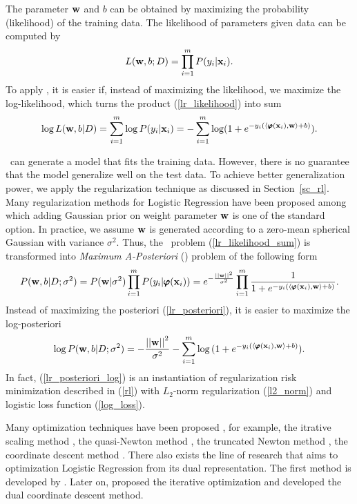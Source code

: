 {%
The parameter $\mathbf {w}$ and $b$ can be obtained by maximizing the probability (likelihood) of the training data.
The likelihood of parameters given data can be computed by
\begin{align}
	L(\mathbf {w},b;D) = \prod_{i=1}^mP(y_i|\mathbf {x}_i). \label{lr_likelihood}
\end{align}
To apply \mle, it is easier if, instead of maximizing the likelihood, we maximize the log-likelihood, which turns the product (\ref{lr_likelihood}) into sum
\begin{align}
	\log L(\mathbf {w},b|D) = \sum_{i=1}^{m}\log P(y_i|\mathbf {x}_i) = -\sum_{i=1}^{m}\log (1+e^{ -y_i(\langle \pmb \varphi(\mathbf {x}_i), \mathbf {w} \rangle+b) }) \label{lr_likelihood_sum}.
\end{align}

\mle\ can generate a model that fits the training data.
However, there is no guarantee that the model generalize well on the test data.
To achieve better generalization power, we apply the regularization technique as discussed in Section~\ref{sc_rl}.
Many regularization methods for Logistic Regression have been proposed \citep{Chen99,Chen00,Goodman03} among which adding Gaussian prior on weight parameter $\mathbf {w}$ is one of the standard option.
In practice, we assume $\mathbf {w}$ is generated according to a zero-mean spherical Gaussian with variance $\sigma^2$.
Thus, the \mle\ problem (\ref{lr_likelihood_sum}) is transformed into \textit{Maximum A-Posteriori} (\map) problem of the following form
\begin{align}
	P(\mathbf {w},b|D;\sigma^2) = P(\mathbf {w}|\sigma^2)\prod_{i=1}^mP(y_i|\pmb \varphi(\mathbf {x}_i))=e^{ -\frac{\left|\left| \mathbf {w} \right|\right|^2}{\sigma^2} }\prod_{i=1}^{m}{\frac{1}{1+e^{ -y_i(\langle \pmb \varphi(\mathbf {x}_i), \mathbf {w} \rangle+b) }}}. \label{lr_posteriori}
\end{align}
Instead of maximizing the posteriori (\ref{lr_posteriori}), it is easier to maximize the log-posteriori
\begin{align}
	\log P(\mathbf {w},b|D;\sigma^2) = -{\frac{\left|\left| \mathbf {w} \right|\right|^2}{\sigma^2}} - \sum_{i=1}^{m}\log{(1+e^{ -y_i(\langle \pmb \varphi(\mathbf {x}_i), \mathbf {w}\rangle+b) })}. \label{lr_posteriori_log}
\end{align}
In fact, (\ref{lr_posteriori_log}) is an instantiation of regularization risk minimization described in (\ref{rl}) with $L_2$-norm regularization (\ref{l2_norm}) and logistic loss function (\ref{log_loss}).

Many optimization techniques have been proposed \citep{Minka03}, for example, 
the {itrative scaling} method \citep{Darroch72,Pietra97inducing,Berger97,Goodman02Sequential,Jin03a},
the quasi-Newton method \citep{Minka03},
the truncated Newton method \citep{Komarek05making,Lin2008trust},
the coordinate descent method \citep{Huang09iterative}.
There also exists the line of research that aims to optimization Logistic Regression from its dual representation.
The first method is developed by \citet{Jaakkola99probabilistic}.
Later on, \citet{Keerthi05a} proposed the iterative optimization and \citet{Yu11dual} developed the dual coordinate descent method.




}
